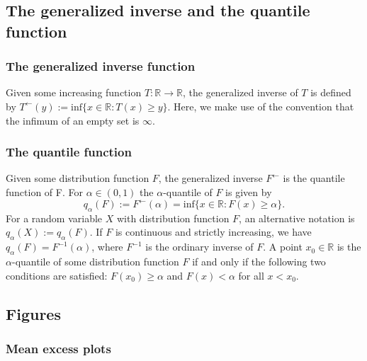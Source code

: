 \documentclass[a4paper,11pt]{article}
\theoremstyle{definition}
\theoremstyle{definition}
\theoremstyle{definition}
\theoremstyle{definition}
\theoremstyle{remark}
\begin{document}
\hypertarget{sec:quantiles}{%
\subsection{The generalized inverse and the quantile function}\label{sec:quantiles}}

\hypertarget{the-generalized-inverse-function}{%
\subsubsection{The generalized inverse function}\label{the-generalized-inverse-function}}

Given some increasing function \(T: \mathbb R \rightarrow \mathbb R\), the generalized inverse of \(T\) is defined by \(T^{\leftarrow}(y) := \text{inf}\{x \in \mathbb R:T(x)\geq y\}\). Here, we make use of the convention that the infimum of an empty set is \(\infty\).

\hypertarget{the-quantile-function}{%
\subsubsection{The quantile function}\label{the-quantile-function}}

Given some distribution function \(F\), the generalized inverse \(F^{\leftarrow}\) is the quantile function of F. For \(\alpha \in (0,1)\) the \(\alpha\)-quantile of \(F\) is given by
\begin{equation}
q_{\alpha}(F):=F^{\leftarrow}(\alpha) = \text{inf}\{x \in \mathbb R: F(x) \geq \alpha \}.
\label{eq:quantilefunction}
\end{equation}
For a random variable \(X\) with distribution function \(F\), an alternative notation is \(q_{\alpha}(X):= q_{\alpha}(F)\). If \(F\) is continuous and strictly increasing, we have \(q_{\alpha}(F)=F^{-1}(\alpha)\), where \(F^{-1}\) is the ordinary inverse of \(F\). A point \(x_0 \in \mathbb R\) is the \(\alpha\)-quantile of some distribution function \(F\) if and only if the following two conditions are satisfied: \(F(x_0) \geq \alpha\) and \(F(x) < \alpha\) for all \(x < x_0\).

\newpage

\hypertarget{figures}{%
\subsection{Figures}\label{figures}}

\hypertarget{sec:meplots}{%
\subsubsection{Mean excess plots}\label{sec:meplots}}
\end{document}
